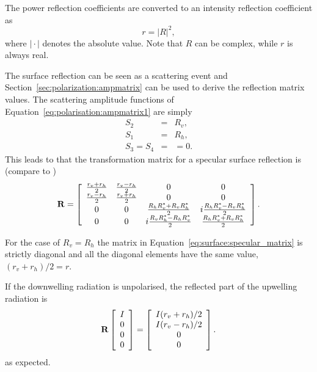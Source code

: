 The power reflection coefficients are converted to an intensity
 reflection coefficient as
 \begin{equation}
   \label{eq:surface:R2r}
   r = |R|^2,
 \end{equation}
 where $|\!\cdot\!|$ denotes the absolute value. Note that $R$ can be
 complex, while $r$ is always real.

The surface reflection can be seen as a scattering event and
Section~\ref{sec:polarization:ampmatrix} can be used to derive the
reflection matrix values. The scattering amplitude functions of
Equation~\ref{eq:polarisation:ampmatrix1} are simply
\begin{eqnarray}
  S_2 &=& R_v, \\
  S_1 &=& R_h, \\
  S_3 = S_4 &=& =0.
\end{eqnarray}
This leads to that the transformation matrix for a specular surface
reflection is (compare to \citet[Sec.\ 5.4.3]{liou:02})
\begin{equation}
  \label{eq:surface:specular_matrix}
  \mathbf{R} =
     \left[\begin{array}{cccc}
       \frac{r_v+r_h}{2}&\frac{r_v-r_h}{2}&0&0\\
       \frac{r_v-r_h}{2}&\frac{r_v+r_h}{2}&0&0\\
    0&0&\frac{R_hR_v^\ast+R_vR_h^\ast}{2}&i\frac{R_hR_v^\ast-R_vR_h^\ast}{2}\\
    0&0&i\frac{R_vR_h^\ast-R_hR_v^\ast}{2}&\frac{R_hR_v^\ast+R_vR_h^\ast}{2}\\
     \end{array}
     \right].
\end{equation}

For the case of $R_v=R_h$ the matrix in
Equation~\ref{eq:surface:specular_matrix} is strictly diagonal and all the
diagonal elements have the same value, $(r_v+r_h)/2=r$.

If the downwelling radiation is unpolarised, the reflected part of the
upwelling radiation is
\begin{equation}
  \mathbf{R}
  \left[ \begin{array}{c} I\\0\\0\\0 \end{array} \right] =
  \left[ \begin{array}{c} I(r_v+r_h)/2\\I(r_v-r_h)/2\\0\\0 
  \end{array} \right].
\end{equation}
as expected.


